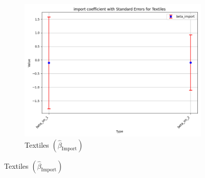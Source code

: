 \documentclass{article}
\begin{document}
\begin{figure}[ht!]
    \begin{subfigure}[t]{0.32\textwidth}
        \centering
        \includegraphics[width=\textwidth]{figure/empirical_stat_mixture_kmshare_ciiu_beta_import_with_error_bars_Textiles.png}
        \caption{Textiles $(\hat{\beta}_{\text{Import}})$}
    \end{subfigure}
\end{figure}
\end{document}
